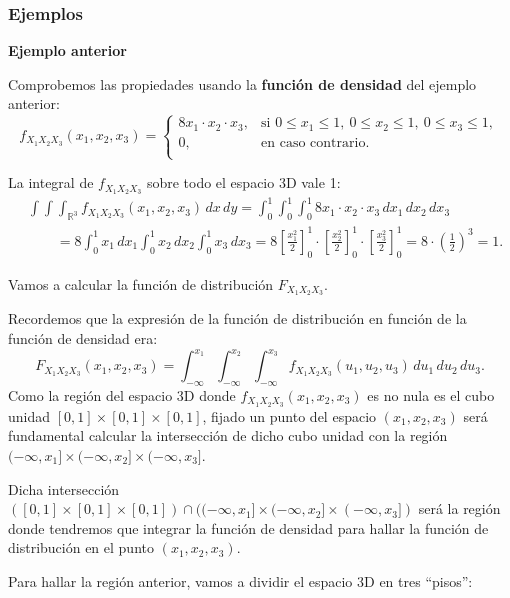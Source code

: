 \documentclass[]{book}
\begin{document}
\hypertarget{ejemplos-13}{%
\subsubsection{Ejemplos}\label{ejemplos-13}}

\textbf{Ejemplo anterior}

Comprobemos las propiedades usando la \textbf{función de densidad} del ejemplo anterior:
\[
f_{X_1X_2X_3}(x_1,x_2,x_3)=\begin{cases}
8 x_1\cdot x_2\cdot x_3, & \mbox{si }0\leq x_1\leq 1,\ 0\leq x_2\leq 1,\ 0\leq x_3\leq 1, \\
0, & \mbox{en caso contrario.}\\
\end{cases}
\]

La integral de \(f_{X_1X_2X_3}\) sobre todo el espacio 3D vale 1:
\[
\begin{array}{rl}
& \int\int\int_{\mathbb{R}^3} f_{X_1X_2X_3}(x_1,x_2,x_3)\,dx\, dy=\int_0^1\int_0^1\int_0^1 8 x_1\cdot x_2\cdot x_3\, dx_1\,dx_2\,dx_3\\ & \qquad=8\int_0^1 x_1\, dx_1\int_0^1 x_2\, dx_2\int_0^1 x_3\,dx_3=8\left[\frac{x_1^2}{2}\right]_0^1\cdot\left[\frac{x_2^2}{2}\right]_0^1\cdot \left[\frac{x_3^2}{2}\right]_0^1=8\cdot\left(\frac{1}{2}\right)^3 =1.
\end{array}
\]

Vamos a calcular la función de distribución \(F_{X_1X_2X_3}\).

Recordemos que la expresión de la función de distribución en función de la función de densidad era:
\[
F_{X_1X_2X_3}(x_1,x_2,x_3)=\int_{-\infty}^{x_1}\int_{-\infty}^{x_2}\int_{-\infty}^{x_3}f_{X_1X_2X_3}(u_1,u_2,u_3)\,du_1\, du_2\, du_3.
\]
Como la región del espacio 3D donde \(f_{X_1X_2X_3}(x_1,x_2,x_3)\) es no nula es el cubo unidad \([0,1]\times [0,1]\times [0,1]\), fijado un punto del espacio \((x_1,x_2,x_3)\) será fundamental calcular la intersección de dicho cubo unidad con la región \((-\infty,x_1]\times (-\infty,x_2]\times (-\infty,x_3]\).

Dicha intersección \(([0,1]\times [0,1]\times [0,1])\cap ((-\infty,x_1]\times (-\infty,x_2]\times (-\infty,x_3])\) será la región donde tendremos que integrar la función de densidad para hallar la función de distribución en el punto \((x_1,x_2,x_3)\).

Para hallar la región anterior, vamos a dividir el espacio 3D en tres ``pisos'':
\end{document}
